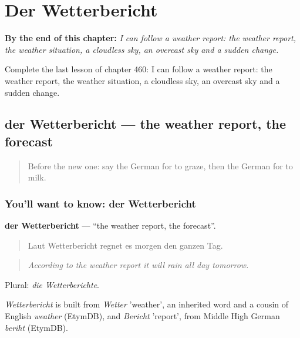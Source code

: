 
\chapter{Der Wetterbericht}
\label{ch:ge-der-wetterbericht}

\begin{chapteropening}
\textbf{By the end of this chapter:} \emph{I can follow a weather report: the weather report, the weather situation, a cloudless sky, an overcast sky and a sudden change.}

Complete the last lesson of chapter 460: I can follow a weather report: the weather report, the weather situation, a cloudless sky, an overcast sky and a sudden change.
\end{chapteropening}

\section[der Wetterbericht]{der Wetterbericht — the weather report, the forecast}

\label{lesson:GE-C460-wetterbericht}



\begin{quote}
Before the new one: say the German for to graze, then the German for to milk.
\end{quote}

\subsection*{You'll want to know: der Wetterbericht}
\textbf{der Wetterbericht} — \textquotedblleft{}the weather report, the forecast\textquotedblright{}.

\begin{quote}
Laut Wetterbericht regnet es morgen den ganzen Tag.
\end{quote}

\begin{quote}
\emph{According to the weather report it will rain all day tomorrow.}
\end{quote}

Plural: \emph{die Wetterberichte}.

\begin{cousinweb}
\emph{Wetterbericht} is built from \emph{Wetter} 'weather', an inherited word and a cousin of English \emph{weather} (EtymDB), and \emph{Bericht} 'report', from Middle High German \emph{beriht} (EtymDB).
\end{cousinweb}

